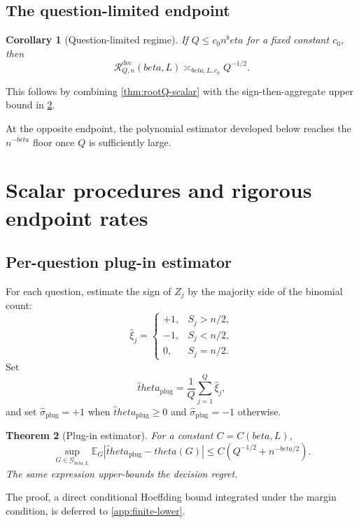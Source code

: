 \documentclass[11pt]{article}
\def\beta{beta}%
\def\theta{theta}%
\newtheorem{theorem}{Theorem}[section]
\newtheorem{corollary}[theorem]{Corollary}
\newcommand{\E}{\mathbb E}
\newcommand{\calG}{\mathcal G}
\newcommand{\calR}{\mathcal R}
\newcommand\ced[1]{{\color{teal!70!black} #1}}
\begin{document}
\subsection{The question-limited endpoint}

\begin{corollary}[Question-limited regime]
\label{cor:question-limited}
If $Q\le c_0 n^\beta$ for a fixed constant $c_0$, then
\begin{equation}
\label{eq:question-limited}
\calR^{\mathrm{dec}}_{Q,n}(\beta,L)
\asymp_{\beta,L,c_0}
Q^{-1/2}.
\end{equation}
\end{corollary}
This follows by combining \cref{thm:rootQ-scalar} with the sign-then-aggregate upper bound in \cref{thm:plugin-scalar}.

At the opposite endpoint, the polynomial estimator developed below reaches the $n^{-\beta}$ floor once $Q$ is sufficiently large.

\section{Scalar procedures and rigorous endpoint rates}
\label{sec:scalar-estimators}

\subsection{Per-question plug-in estimator}

For each question, estimate the sign of $Z_j$ by the majority side of the binomial count:
\[
\widehat\xi_j
=
\begin{cases}
+1,&S_j>n/2,\\
-1,&S_j<n/2,\\
0,&S_j=n/2.
\end{cases}
\]
Set
\[
\widehat\theta_{\mathrm{plug}}
=
\frac1Q\sum_{j=1}^Q\widehat\xi_j,
\]
\ced{and set $\widehat\sigma_{\mathrm{plug}}=+1$ when $\widehat\theta_{\mathrm{plug}}\ge0$ and $\widehat\sigma_{\mathrm{plug}}=-1$ otherwise.}

\begin{theorem}[Plug-in estimator]
\label{thm:plugin-scalar}
For a constant $C=C(\beta,L)$,
\begin{equation}
\label{eq:plugin-scalar}
\sup_{G\in\calG_{\beta,L}}
\E_G|\widehat\theta_{\mathrm{plug}}-\theta(G)|
\le
C\left(Q^{-1/2}+n^{-\beta/2}\right).
\end{equation}
The same expression upper-bounds the decision regret.
\end{theorem}
The proof, a direct conditional Hoeffding bound integrated under the margin condition, is deferred to \cref{app:finite-lower}.
\end{document}
